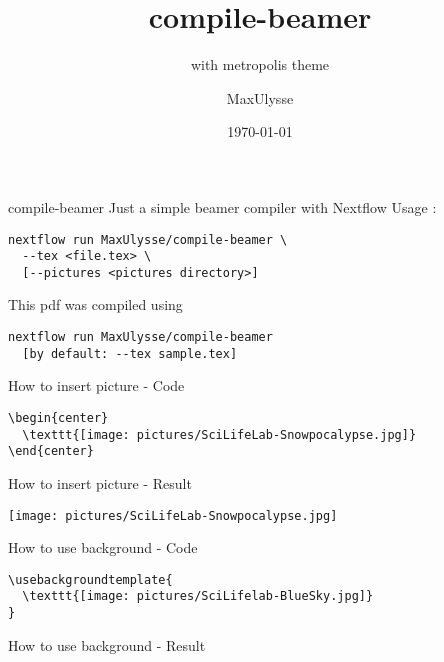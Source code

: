 \documentclass{beamer}
\author{MaxUlysse}
\title{compile-beamer}
\subtitle{with metropolis theme}
\institute{
  SciLifeLab - Karolinska Institutet\\
  \vfill
  \texttt{[image: pictures/SciLifeLab]}
  \hfill
  \texttt{[image: pictures/KI]}
  \vfill
}
\date{\today}
\begin{document}
\maketitle

\begin{frame}[fragile]{compile-beamer}
  Just a simple beamer compiler with Nextflow
  Usage :
  \begin{verbatim}
nextflow run MaxUlysse/compile-beamer \
  --tex <file.tex> \
  [--pictures <pictures directory>]
  \end{verbatim}
  This pdf was compiled using
  \begin{verbatim}
nextflow run MaxUlysse/compile-beamer
  [by default: --tex sample.tex]
  \end{verbatim}
\end{frame}

\begin{frame}[fragile]{How to insert picture - Code}
  \begin{verbatim}
\begin{center}
  \texttt{[image: pictures/SciLifeLab-Snowpocalypse.jpg]}
\end{center}
  \end{verbatim}
\end{frame}

\begin{frame}{How to insert picture - Result}
  \begin{center}
    \texttt{[image: pictures/SciLifeLab-Snowpocalypse.jpg]}
  \end{center}
\end{frame}

\begin{frame}[fragile]{How to use background - Code}
  \begin{verbatim}
  \end{verbatim}
\end{frame}

\usebackgroundtemplate{
  \texttt{[image: pictures/SciLifelab-BlueSky.jpg]}
}

\begin{frame}{How to use background - Result}
\end{frame}
\end{document}

